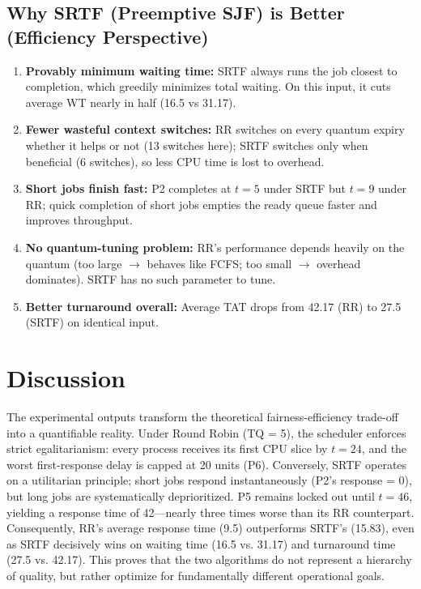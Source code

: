 \documentclass[12pt, a4paper]{article}
\begin{document}
\subsection*{Why SRTF (Preemptive SJF) is Better (Efficiency Perspective)}
\begin{enumerate}
    \item \textbf{Provably minimum waiting time:} SRTF always runs the job closest to completion, which greedily minimizes total waiting. On this input, it cuts average WT nearly in half (16.5 vs 31.17).
    \item \textbf{Fewer wasteful context switches:} RR switches on every quantum expiry whether it helps or not (13 switches here); SRTF switches only when beneficial (6 switches), so less CPU time is lost to overhead.
    \item \textbf{Short jobs finish fast:} P2 completes at $t=5$ under SRTF but $t=9$ under RR; quick completion of short jobs empties the ready queue faster and improves throughput.
    \item \textbf{No quantum-tuning problem:} RR's performance depends heavily on the quantum (too large $\rightarrow$ behaves like FCFS; too small $\rightarrow$ overhead dominates). SRTF has no such parameter to tune.
    \item \textbf{Better turnaround overall:} Average TAT drops from 42.17 (RR) to 27.5 (SRTF) on identical input.
\end{enumerate}

\section*{Discussion}
The experimental outputs transform the theoretical fairness-efficiency trade-off into a quantifiable reality. Under Round Robin (TQ = 5), the scheduler enforces strict egalitarianism: every process receives its first CPU slice by $t=24$, and the worst first-response delay is capped at 20 units (P6). Conversely, SRTF operates on a utilitarian principle; short jobs respond instantaneously (P2's response = 0), but long jobs are systematically deprioritized. P5 remains locked out until $t=46$, yielding a response time of 42---nearly three times worse than its RR counterpart. Consequently, RR's average response time (9.5) outperforms SRTF's (15.83), even as SRTF decisively wins on waiting time (16.5 vs. 31.17) and turnaround time (27.5 vs. 42.17). This proves that the two algorithms do not represent a hierarchy of quality, but rather optimize for fundamentally different operational goals.
\end{document}

